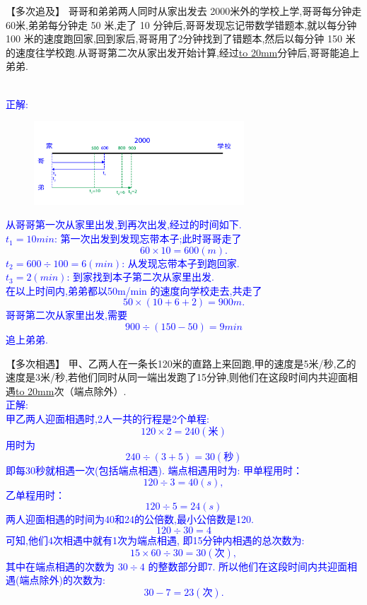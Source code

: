 \item {
    【多次追及】
    哥哥和弟弟两人同时从家出发去 2000米外的学校上学,哥哥每分钟走 60米,弟弟每分钟走 50 米,走了 10 分钟后,哥哥发现忘记带数学错题本,就以每分钟 100 米的速度跑回家,回到家后,哥哥用了2分钟找到了错题本,然后以每分钟 150 米的速度往学校跑.从哥哥第二次从家出发开始计算,经过\underline{\hbox to 20mm{}}分钟后,哥哥能追上弟弟.
    \ifshowSolution 
        \fangsong{}\textcolor{blue}{
            \\正解: \\
            \begin{figure}[H] 
                \centering
                \includegraphics[width=0.7\textwidth]{./pics/Chapter_3/seikai_2.png}
            \end{figure}
                从哥哥第一次从家里出发,到再次出发,经过的时间如下.\\
                $t_1=10 min$: 第一次出发到发现忘带本子;此时哥哥走了
                \[60\times 10 = 600 (m).\]
                $t_2=600\div 100 = 6(min)$: 从发现忘带本子到跑回家.\\
                $t_3=2(min)$: 到家找到本子第二次从家里出发.\\
                在以上时间内,弟弟都以50m/min 的速度向学校走去,共走了
                \[ 50\times (10+6+2) = 900 m.\]
                哥哥第二次从家里出发,需要
                \[900\div (150 - 50) = 9 min \]
                追上弟弟.
        }
    \else
        \vspace{2cm}
    \fi
}

\item {
    【多次相遇】
    甲、乙两人在一条长120米的直路上来回跑,甲的速度是5米/秒,乙的速度是3米/秒,若他们同时从同一端出发跑了15分钟,则他们在这段时间内共迎面相遇\underline{\hbox to 20mm{}}次（端点除外）. 
    \ifshowSolution 
        \fangsong{}\textcolor{blue}{
            \\正解: \\
                甲乙两人迎面相遇时,2人一共的行程是2个单程:
                $$120\times 2=240(米)$$
                用时为
                $$240\div (3+5)=30(秒)$$
                即每30秒就相遇一次(包括端点相遇).
                端点相遇用时为:
                甲单程用时：
                 $$120\div 3 = 40 (s),$$
                乙单程用时：
                $$120\div 5=24 (s)$$
                两人迎面相遇的时间为40和24的公倍数,最小公倍数是120.
                $$120\div 30=4$$
                可知,他们4次相遇中就有1次为端点相遇,
                即15分钟内相遇的总次数为:
                 $$15\times 60\div 30 = 30(次),$$
                其中在端点相遇的次数为 $30\div 4$ 的整数部分即7.
                所以他们在这段时间内共迎面相遇(端点除外)的次数为:
                $$30-7=23(次).$$
        }
    \else
        \vspace{2cm}
    \fi
}

